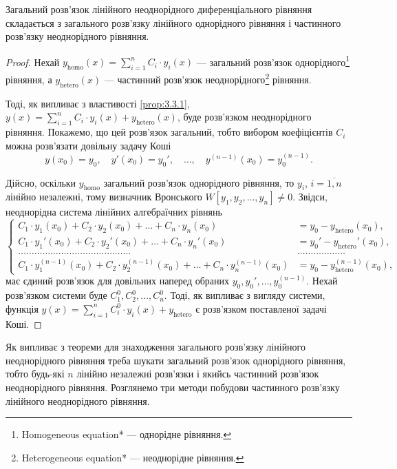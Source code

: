 \begin{theorem}
	Загальний розв'язок лінійного неоднорідного диференціального рівняння складається з загального розв'язку лінійного однорідного рівняння і частинного розв'язку неоднорідного рівняння.
\end{theorem}
\begin{proof}
	Нехай $y_{\text{homo}}(x) = \sum_{i = 1}^n C_i \cdot y_i(x)$ --- загальний розв'язок однорідного\footnote{Homogeneous equation* --- однорідне рівняння.} рівняння, а $y_{\text{hetero}}(x)$ --- частинний розв'язок неоднорідного\footnote{Heterogeneous equation* --- неоднорідне рівняння.} рівняння. \parvskip

	Тоді, як випливає з властивості \ref{prop:3.3.1}, $y(x) = \sum_{i = 1}^n C_i \cdot y_i(x) + y_{\text{hetero}}(x)$, буде розв'язком неоднорідного рівняння. Покажемо, що цей розв'язок  загальний, тобто вибором коефіцієнтів $C_i$ можна розв'язати довільну задачу Коші
	\begin{equation*}
		y(x_0) = y_0, \quad y'(x_0) = y_0', \quad \ldots, \quad y^{(n - 1)}(x_0) = y_0^{(n - 1)}.
	\end{equation*}

	Дійсно, оскільки $y_{\text{homo}}$ загальний роз\-в'яз\-ок однорідного рівняння, то $y_i$, $i = \overline{1, n}$ лінійно незалежні, тому визначник Вронського $W[y_1, y_2, \ldots, y_n] \ne 0$. Звідси, неоднорідна система лінійних алгебраїчних рівнянь 
	\begin{equation*}
		\left\{ \begin{aligned}
			C_1 \cdot y_1(x_0) + C_2 \cdot y_2(x_0) + \ldots + C_n \cdot y_n(x_0) &= y_0 - y_{\text{hetero}}(x_0), \\
			C_1 \cdot y_1'(x_0) + C_2 \cdot y_2'(x_0) + \ldots + C_n \cdot y_n'(x_0) &= y_0' - y_{\text{hetero}}'(x_0), \\
			\ldots \ldots \ldots \ldots \ldots \ldots \ldots \ldots \ldots \ldots \ldots \ldots \ldots \ldots & \ldots \ldots \ldots \ldots \ldots \ldots 	\\
			C_1 \cdot y_1^{(n - 1)}(x_0) + C_2 \cdot y_2^{(n - 1)}(x_0) + \ldots + C_n \cdot y_n^{(n - 1)}(x_0) &= y_0 - y_{\text{hetero}}^{(n - 1)}(x_0),
		\end{aligned} \right.
	\end{equation*}
	має єдиний роз\-в'яз\-ок для довільних наперед обраних $y_0, y_0', \ldots, y_0^{(n - 1)}$. Нехай роз\-в'яз\-ком системи буде $C_1^0, C_2^0, \ldots, C_n^0$. Тоді, як випливає з вигляду системи, функція $y(x) = \sum_{i = 1}^n C_i^0 \cdot y_i(x) + y_{\text{hetero}}$ є роз\-в'яз\-ком поставленої задачі Коші.
\end{proof}

Як випливає з теореми для знаходження загального розв'язку лінійного неоднорідного рівняння треба шукати загальний розв'язок однорідного рівняння, тобто будь-які $n$ лінійно незалежні розв'язки і якийсь частинний розв'язок неоднорідного рівняння. Розглянемо три методи побудови частинного розв'язку лінійного неоднорідного рівняння.